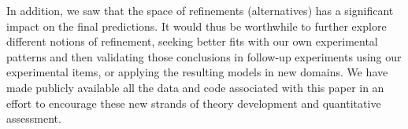 \documentclass[leqno,12pt]{article}
\begin{document}
In addition, we saw that the space of refinements (alternatives) has a
significant impact on the final predictions. It would thus be
worthwhile to further explore different notions of refinement, seeking
better fits with our own experimental patterns and then validating
those conclusions in follow-up experiments using our experimental
items, or applying the resulting models in new domains.  We have made
publicly available all the data and code associated with this paper in
an effort to encourage these new strands of theory development and
quantitative assessment.




\setlength{\bibsep}{0pt}

\end{document}
